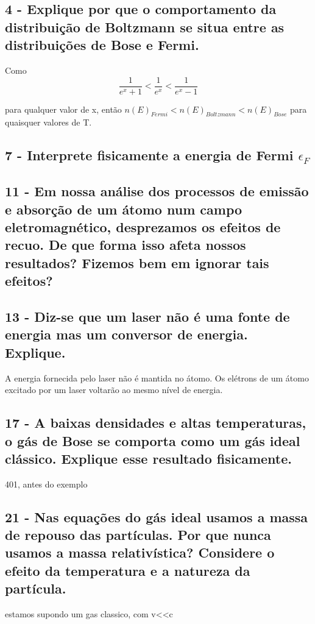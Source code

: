 \documentclass{article}
\begin{document}
\subsection{4 - Explique por que o comportamento da distribuição de Boltzmann se situa entre as distribuições de Bose e Fermi.}

Como 
\begin{equation}
    \frac{1}{e^{x}+1}<\frac{1}{e^{x}}<\frac{1}{e^{x}-1}
\end{equation}

para qualquer valor de x, então $n(E)_{Fermi} < n(E)_{Boltzmann} < n(E)_{Bose}$
para quaisquer valores de T.

\subsection{7 - Interprete fisicamente a energia de Fermi $\epsilon_F$}

\subsection{11 - Em nossa análise dos processos de emissão e absorção de um átomo num campo eletromagnético, desprezamos os efeitos de recuo. De que forma isso afeta nossos resultados? Fizemos bem em ignorar tais efeitos?}

\subsection{13 - Diz-se que um laser não é uma fonte de energia mas um conversor de energia. Explique.}
A energia fornecida pelo laser não é mantida no átomo. Os elétrons de um átomo excitado por um laser voltarão ao mesmo nível de energia.

\subsection{17 - A baixas densidades e altas temperaturas, o gás de Bose se comporta como um gás ideal clássico. Explique esse resultado fisicamente.}
401, antes do exemplo

\subsection{21 - Nas equações do gás ideal usamos a massa de repouso das partículas. Por que nunca usamos a massa relativística? Considere o efeito da temperatura e a natureza da partícula.}
estamos supondo um gas classico, com v<<c
\end{document}
